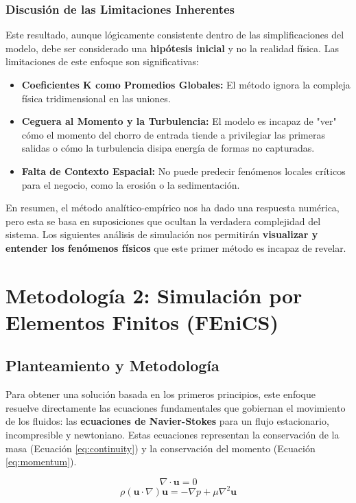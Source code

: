 \documentclass[11pt, a4paper,oneside]{article}
\begin{document}
\subsubsection*{Discusión de las Limitaciones Inherentes}
Este resultado, aunque lógicamente consistente dentro de las simplificaciones del modelo, debe ser considerado una \textbf{hipótesis inicial} y no la realidad física. Las limitaciones de este enfoque son significativas:
\begin{itemize}
    \item \textbf{Coeficientes K como Promedios Globales:} El método ignora la compleja física tridimensional en las uniones.
    \item \textbf{Ceguera al Momento y la Turbulencia:} El modelo es incapaz de "ver" cómo el momento del chorro de entrada tiende a privilegiar las primeras salidas o cómo la turbulencia disipa energía de formas no capturadas.
    \item \textbf{Falta de Contexto Espacial:} No puede predecir fenómenos locales críticos para el negocio, como la erosión o la sedimentación.
\end{itemize}
En resumen, el método analítico-empírico nos ha dado una respuesta numérica, pero esta se basa en suposiciones que ocultan la verdadera complejidad del sistema. Los siguientes análisis de simulación nos permitirán \textbf{visualizar y entender los fenómenos físicos} que este primer método es incapaz de revelar.

\section{Metodología 2: Simulación por Elementos Finitos (FEniCS)}
\subsection{Planteamiento y Metodología}
Para obtener una solución basada en los primeros principios, este enfoque resuelve directamente las ecuaciones fundamentales que gobiernan el movimiento de los fluidos: las \textbf{ecuaciones de Navier-Stokes} para un flujo estacionario, incompresible y newtoniano. Estas ecuaciones representan la conservación de la masa (Ecuación \ref{eq:continuity}) y la conservación del momento (Ecuación \ref{eq:momentum}).

\begin{equation} \label{eq:continuity}
    \nabla \cdot \mathbf{u} = 0
\end{equation}
\begin{equation} \label{eq:momentum}
    \rho (\mathbf{u} \cdot \nabla) \mathbf{u} = -\nabla p + \mu \nabla^2 \mathbf{u}
\end{equation}
\end{document}
